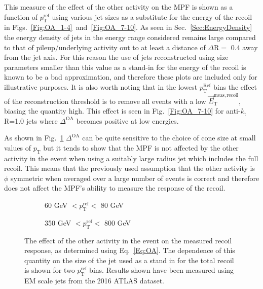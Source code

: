 This measure of the effect of the other activity on the MPF is shown as a function of $p_{\mathrm T}^{\mathrm {ref}}$ using various jet sizes as a substitute for the energy of the recoil in Figs.~\ref{Fig:OA_1-4}~and~\ref{Fig:OA_7-10}.  
As seen in Sec.~\ref{Sec:EnergyDensity} the energy density of jets in the energy range considered remains large compared to that of pileup/underlying activity out to at least a distance of $\Delta\mathrm{R}=$ 0.4 away from the jet axis.  
For this reason the use of jets reconstructed using size parameters smaller than this value as a stand-in for the energy of the recoil is known to be a bad approximation, and therefore these plots are included only for illustrative purposes.  
It is also worth noting that in the lowest $p_{\mathrm{T}}^{\mathrm{Ref}}$ bins the effect of the reconstruction threshold is to remove all events with a low $\vec{E}_{\mathrm T}^{\mathrm{meas, recoil}}$, biasing the quantity high.  
This effect is seen in Fig.~\ref{Fig:OA_7-10} for anti-$k_\mathrm{t}$ R=1.0 jets where $\Delta^{\mathrm{OA}}$ becomes positive at low energies.  


As shown in Fig.~\ref{Fig:OA_ConeSize} $\Delta^{\mathrm{OA}}$ can be quite sensitive to the choice of cone size at small values of $p_{\mathrm T}$ but it tends to show that the MPF is not affected by the other activity in the event when using a suitably large radius jet which includes the full recoil.
This means that the previously used assumption that the other activity is $\phi$ symmetric when averaged over a large number of events is correct and therefore does not affect the MPF's ability to measure the response of the recoil.



\begin{figure}[!ht]
  \centering
  \begin{subfigure}{.5\textwidth}
    \centering
    \caption{60 GeV $< p_{\mathrm{T}}^{\mathrm{ref}} < $ 80 GeV}
  \end{subfigure}%
  \begin{subfigure}{.5\textwidth}  \centering
    \caption{350 GeV $< p_{\mathrm{T}}^{\mathrm{ref}} < $ 800 GeV}
  \end{subfigure}
  \caption[$\Delta^{\mathrm{OA}}$ using various cone sizes]
{\small The effect of the other activity in the event on the measured recoil response, as determined using Eq.~\ref{Eq:OA}.  The dependence of this quantity on the size of the jet used as a stand in for the total recoil is shown for two $p_{\mathrm{T}}^{\mathrm {ref}}$ bins.  Results shown have been measured using EM scale jets from the 2016 ATLAS dataset.  }
  \label{Fig:OA_ConeSize}
\end{figure}




